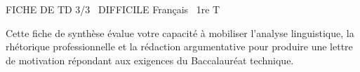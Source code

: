 \documentclass[11pt]{article}
\begin{document}
\begin{tcolorbox}[enhanced,colback=popink,colframe=popink,arc=10pt,boxrule=0pt,left=12pt,right=12pt,top=9pt,bottom=9pt]
{\color{white}\popxbold\small FICHE DE TD 3/3 \textbullet\ DIFFICILE \hfill Français \textbullet\ 1re T\par}
\end{tcolorbox}
\vspace{4pt}
Cette fiche de synthèse évalue votre capacité à mobiliser l'analyse linguistique, la rhétorique professionnelle et la rédaction argumentative pour produire une lettre de motivation répondant aux exigences du Baccalauréat technique.
\end{document}

